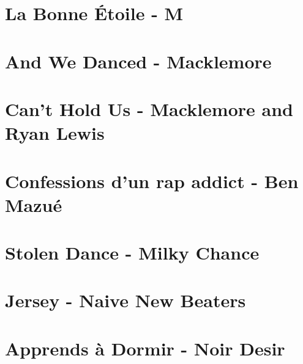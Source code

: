 \documentclass{guitartabs}
\begin{document}
\section{La Bonne Étoile - M}
\begin{guitar}

\end{guitar}

\section{And We Danced - Macklemore}
\begin{guitar}

\end{guitar}

\section{Can't Hold Us - Macklemore and Ryan Lewis}
\begin{guitar}

\end{guitar}


\section{Confessions d'un rap addict - Ben Mazué}
\begin{guitar}

\end{guitar}

\section{Stolen Dance - Milky Chance}
\begin{guitar}

\end{guitar}


\section{Jersey - Naive New Beaters}
\begin{guitar}

\end{guitar}



\section*{Apprends à Dormir - Noir Desir}
\begin{guitar}

\end{guitar}
\end{document}
